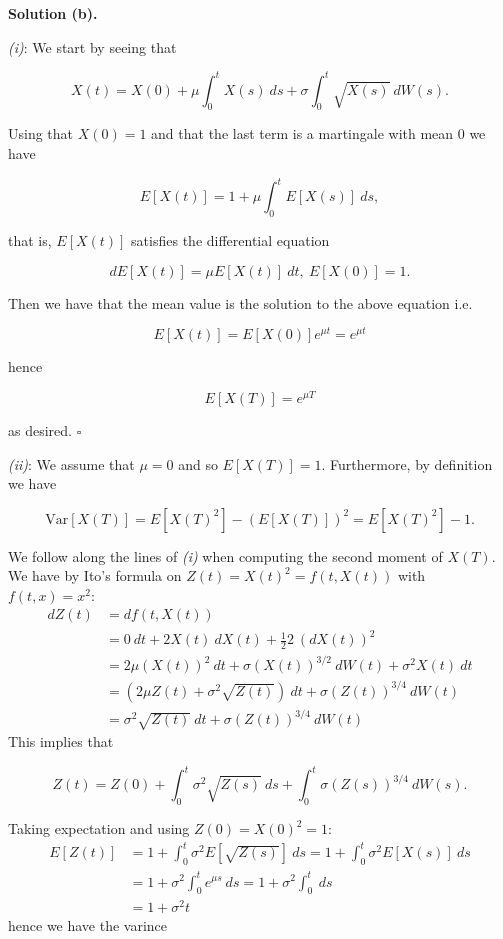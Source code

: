 \documentclass[a4paper,12pt,openany]{book}
\begin{document}
\noindent\makebox[\linewidth]{\rule{\textwidth}{0.4pt}}

\textbf{Solution (b).}

\emph{(i)}: We start by seeing that

\[
X(t)=X(0)+\mu\int_0^t X(s)\ ds+\sigma\int_0^t\sqrt{X(s)}\ dW(s).
\]

Using that \(X(0)=1\) and that the last term is a martingale with mean 0 we have

\[
E[X(t)]=1+\mu\int_0^tE[X(s)]\ ds,
\]

that is, \(E[X(t)]\) satisfies the differential equation

\[
dE[X(t)]=\mu E[X(t)]\ dt,\ E[X(0)]=1.
\]

Then we have that the mean value is the solution to the above equation i.e.

\[
E[X(t)]=E[X(0)]e^{\mu t}=e^{\mu t}
\]

hence

\[
E[X(T)]=e^{\mu T}
\]

as desired. \(\square\)

\emph{(ii)}: We assume that \(\mu =0\) and so \(E[X(T)]=1\). Furthermore, by definition we have

\[
\text{Var}[X(T)]=E[X(T)^2]-(E[X(T)])^2=E[X(T)^2]-1.
\]

We follow along the lines of \emph{(i)} when computing the second moment of \(X(T)\). We have by Ito's formula on \(Z(t)=X(t)^2=f(t,X(t))\) with \(f(t,x)=x^2\):
\begin{align*}
dZ(t)&=df(t,X(t))\\
&=0\ dt+ 2X(t)\ dX(t)+\frac{1}{2}2\ (dX(t))^2\\
&=2\mu (X(t))^2 \ dt+\sigma (X(t))^{3/2}\ dW(t)+\sigma^2 X(t)\ dt\\
&=\left(2\mu Z(t)+\sigma^2 \sqrt{Z(t)}\right)\ dt +\sigma (Z(t))^{3/4}\ dW(t)\\
&=\sigma^2 \sqrt{Z(t)}\ dt +\sigma (Z(t))^{3/4}\ dW(t)
\end{align*}
This implies that

\[
Z(t)=Z(0)+\int_0^t\sigma^2 \sqrt{Z(s)}\ ds+\int_0^t\sigma (Z(s))^{3/4}\ dW(s).
\]

Taking expectation and using \(Z(0)=X(0)^2=1\):
\begin{align*}
E[Z(t)]&=1+\int_0^t\sigma^2 E\left[\sqrt{Z(s)}\right]\ ds=1+\int_0^t\sigma^2 E\left[X(s)\right]\ ds\\
&=1+\sigma^2\int_0^t e^{\mu s}\ ds=1+\sigma^2\int_0^t\ ds\\
&=1+\sigma^2t
\end{align*}
hence we have the varince
\end{document}
